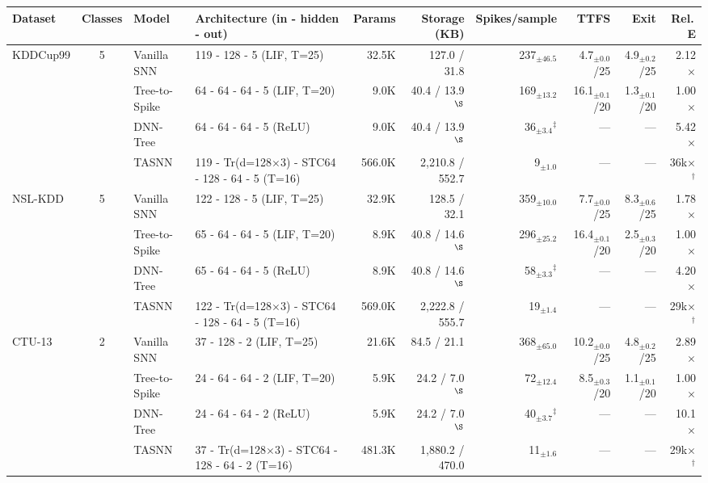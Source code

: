\begin{table}[!ht]
\label{tab:architecture}
{\scriptsize
\begin{tabular}{l c l l r r r r r r}
\toprule
\textbf{Dataset} & \textbf{Classes} & \textbf{Model} & \textbf{Architecture (in - hidden - out)} & \textbf{Params} & \textbf{Storage (KB)} & \textbf{Spikes/sample} & \textbf{TTFS} & \textbf{Exit} & \textbf{Rel.\,E} \\
\midrule
\multirow{4}{*}{KDDCup99} & \multirow{4}{*}{5}
  & Vanilla SNN   & 119 - 128 - 5 (LIF, T=25) & 32.5K & 127.0 / 31.8 & 237$_{\pm46.5}$ & 4.7$_{\pm0.0}$/25 & 4.9$_{\pm0.2}$/25 & 2.12$\times$ \\
& & Tree-to-Spike & 64 - 64 - 64 - 5 (LIF, T=20) & 9.0K & 40.4 / 13.9$^{\S}$ & 169$_{\pm13.2}$ & 16.1$_{\pm0.1}$/20 & 1.3$_{\pm0.1}$/20 & 1.00$\times$ \\
& & DNN-Tree      & 64 - 64 - 64 - 5 (ReLU) & 9.0K & 40.4 / 13.9$^{\S}$ & 36$_{\pm3.4}$$^\ddagger$ & --- & --- & 5.42$\times$ \\
& & TASNN         & 119 - Tr(d=128$\times$3) - STC64 - 128 - 64 - 5 (T=16) & 566.0K & 2,210.8 / 552.7 & 9$_{\pm1.0}$ & --- & --- & 36k$\times$$^\dagger$ \\
\midrule
\multirow{4}{*}{NSL-KDD} & \multirow{4}{*}{5}
  & Vanilla SNN   & 122 - 128 - 5 (LIF, T=25) & 32.9K & 128.5 / 32.1 & 359$_{\pm10.0}$ & 7.7$_{\pm0.0}$/25 & 8.3$_{\pm0.6}$/25 & 1.78$\times$ \\
& & Tree-to-Spike & 65 - 64 - 64 - 5 (LIF, T=20) & 8.9K & 40.8 / 14.6$^{\S}$ & 296$_{\pm25.2}$ & 16.4$_{\pm0.1}$/20 & 2.5$_{\pm0.3}$/20 & 1.00$\times$ \\
& & DNN-Tree      & 65 - 64 - 64 - 5 (ReLU) & 8.9K & 40.8 / 14.6$^{\S}$ & 58$_{\pm3.3}$$^\ddagger$ & --- & --- & 4.20$\times$ \\
& & TASNN         & 122 - Tr(d=128$\times$3) - STC64 - 128 - 64 - 5 (T=16) & 569.0K & 2,222.8 / 555.7 & 19$_{\pm1.4}$ & --- & --- & 29k$\times$$^\dagger$ \\
\midrule
\multirow{4}{*}{CTU-13} & \multirow{4}{*}{2}
  & Vanilla SNN   & 37 - 128 - 2 (LIF, T=25) & 21.6K & 84.5 / 21.1 & 368$_{\pm65.0}$ & 10.2$_{\pm0.0}$/25 & 4.8$_{\pm0.2}$/25 & 2.89$\times$ \\
& & Tree-to-Spike & 24 - 64 - 64 - 2 (LIF, T=20) & 5.9K & 24.2 / 7.0$^{\S}$ & 72$_{\pm12.4}$ & 8.5$_{\pm0.3}$/20 & 1.1$_{\pm0.1}$/20 & 1.00$\times$ \\
& & DNN-Tree      & 24 - 64 - 64 - 2 (ReLU) & 5.9K & 24.2 / 7.0$^{\S}$ & 40$_{\pm3.7}$$^\ddagger$ & --- & --- & 10.1$\times$ \\
& & TASNN         & 37 - Tr(d=128$\times$3) - STC64 - 128 - 64 - 2 (T=16) & 481.3K & 1,880.2 / 470.0 & 11$_{\pm1.6}$ & --- & --- & 29k$\times$$^\dagger$ \\

\end{tabular}}
\end{table}

